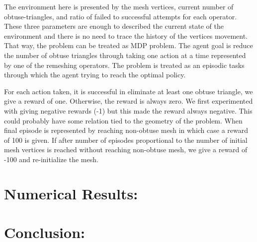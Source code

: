 \documentclass[a4paper,10pt]{article}
\begin{document}
The environment here is presented by the mesh vertices, current number of obtuse-triangles, and ratio of failed to successful attempts for each operator. These three parameters are enough to  described the current state of the environment and there is no need to trace the history of the vertices movement. That way, the problem can be treated as MDP problem. The agent goal is reduce the number of obtuse triangles through taking one action at a time represented by one of the remeshing operators. The problem is treated as an episodic tasks through which the agent trying to reach the optimal policy. 

For each action taken, it is successful in eliminate at least one obtuse triangle, we give a reward of one. Otherwise, the reward is always zero. We first experimented with giving negative rewards (-1) but this made the reward always negative. This could probably have some relation tied to the geometry of the problem. When final episode is represented by reaching non-obtuse mesh in which case a reward of 100 is given. If after number of episodes proportional to the number of initial mesh vertices is reached without reaching non-obtuse mesh, we give a reward of -100 and re-initialize the mesh. 


\section{Numerical Results:}

\section{Conclusion:}


   
   
 
\medskip


\end{document}
